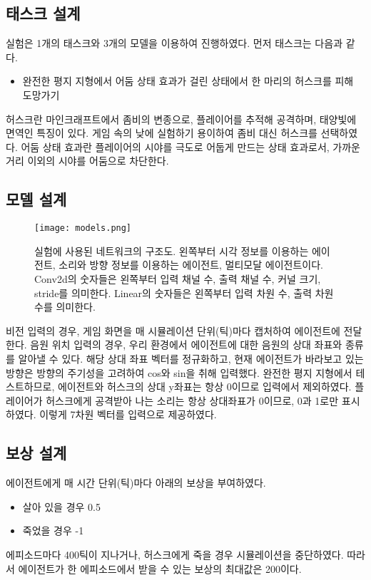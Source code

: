 \documentclass{tudelftposter}
\begin{document}
\subsection{태스크 설계}
실험은 1개의 태스크와 3개의 모델을 이용하여 진행하였다. 먼저 태스크는 다음과 같다. 
\begin{itemize}
  \item 완전한 평지 지형에서 어둠 상태 효과가 걸린 상태에서 한 마리의 허스크를 피해 도망가기
\end{itemize}
허스크란 마인크래프트에서 좀비의 변종으로, 플레이어를 추적해 공격하며, 태양빛에 면역인 특징이 있다. 게임 속의 낮에 실험하기 용이하여 좀비 대신 허스크를 선택하였다. 어둠 상태 효과란 플레이어의 시야를 극도로 어둡게 만드는 상태 효과로서, 가까운 거리 이외의 시야를 어둠으로 차단한다.

\subsection{모델 설계}
\begin{figure}
  \centering
  \texttt{[image: models.png]}
  \caption{실험에 사용된 네트워크의 구조도. 왼쪽부터 시각 정보를 이용하는 에이전트, 소리와 방향 정보를 이용하는 에이전트, 멀티모달 에이전트이다. Conv2d의 숫자들은 왼쪽부터 입력 채널 수, 출력 채널 수, 커널 크기, stride를 의미한다. Linear의 숫자들은 왼쪽부터 입력 차원 수, 출력 차원 수를 의미한다.}
  \label{fig:models}
\end{figure}
비전 입력의 경우, 게임 화면을 매 시뮬레이션 단위(틱)마다 캡처하여 에이전트에 전달한다. 음원 위치 입력의 경우, 우리 환경에서 에이전트에 대한 음원의 상대 좌표와 종류를 알아낼 수 있다. 해당 상대 좌표 벡터를 정규화하고, 현재 에이전트가 바라보고 있는 방향은 방향의 주기성을 고려하여 cos와 sin을 취해 입력했다. 완전한 평지 지형에서 테스트하므로, 에이전트와 허스크의 상대 y좌표는 항상 0이므로 입력에서 제외하였다. 플레이어가 허스크에게 공격받아 나는 소리는 항상 상대좌표가 0이므로, 0과 1로만 표시하였다. 이렇게 7차원 벡터를 입력으로 제공하였다.

\subsection{보상 설계}
에이전트에게 매 시간 단위(틱)마다 아래의 보상을 부여하였다.
\begin{itemize}
  \item 살아 있을 경우 0.5
  \item 죽었을 경우 -1
\end{itemize}
에피소드마다 400틱이 지나거나, 허스크에게 죽을 경우 시뮬레이션을 중단하였다. 따라서 에이전트가 한 에피소드에서 받을 수 있는 보상의 최대값은 200이다.
\end{document}
